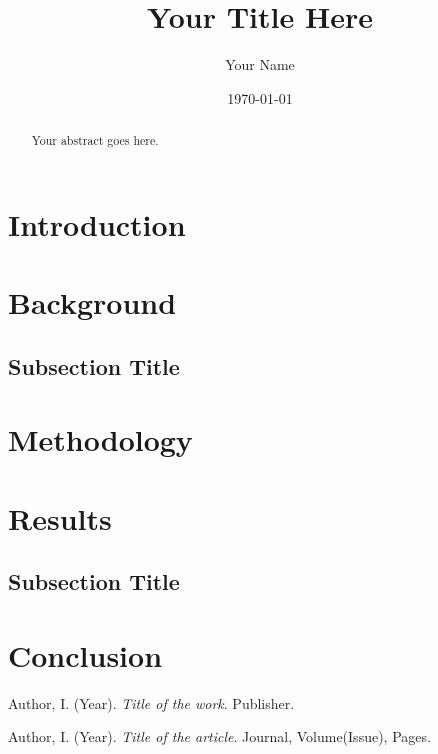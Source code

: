 \documentclass[12pt]{article}
\title{Your Title Here}
\author{Your Name}
\date{\today} %
\begin{document}
\maketitle

\begin{abstract}
Your abstract goes here.
\end{abstract}

\section{Introduction}
\lipsum[1-2] %

\section{Background}
\lipsum[3-4]

\subsection{Subsection Title}
\lipsum[5]

\section{Methodology}
\lipsum[6-7]

\section{Results}
\lipsum[8-9]

\subsection{Subsection Title}
\lipsum[10]

\section{Conclusion}
\lipsum[11-12]

\begin{thebibliography}{99}

Author, I. (Year). \textit{Title of the work}. Publisher.

Author, I. (Year). \textit{Title of the article}. Journal, Volume(Issue), Pages.

\end{thebibliography}
\end{document}
